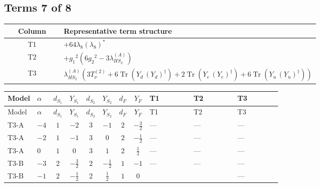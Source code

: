 \documentclass[8pt]{article}
\begin{document}
\begin{landscape}
\subsection*{Terms 7 of 8}
\begin{center}
\begin{tabular}{@{}c >{\raggedright\arraybackslash}p{0.82\linewidth}@{}}
\toprule
Column & Representative term structure \\
\midrule
T1 & \(\displaystyle +64 {\lambda_{8}} \left({\lambda_{8}}\right)^{*}\) \\
\midrule
T2 & \(\displaystyle +{g_1}^2 \left(6 {g_2}^2-3 {\lambda_{HS_2}^{(A)}}\right)\) \\
\midrule
T3 & \(\displaystyle {\lambda_{HS_2}^{(A)}} (3 T_{\nu}^{(2)}+6 \operatorname{Tr}\!\left({Y_d}\,\left({Y_d}\right)^{\dagger}\right)+2 \operatorname{Tr}\!\left({Y_e}\,\left({Y_e}\right)^{\dagger}\right)+6 \operatorname{Tr}\!\left({Y_u}\,\left({Y_u}\right)^{\dagger}\right))\) \\
\midrule
\bottomrule
\end{tabular}
\end{center}
\smallskip
\tiny
\begin{longtable}{@{}llcccccc >{\raggedright\arraybackslash}p{0.21\linewidth} >{\raggedright\arraybackslash}p{0.21\linewidth} >{\raggedright\arraybackslash}p{0.21\linewidth}@{}}
\toprule
Model & $\alpha$ & $d_{S_1}$ & $Y_{S_1}$ & $d_{S_2}$ & $Y_{S_2}$ & $d_F$ & $Y_F$ & T1 & T2 & T3 \\
\midrule
\endfirsthead
\toprule
Model & $\alpha$ & $d_{S_1}$ & $Y_{S_1}$ & $d_{S_2}$ & $Y_{S_2}$ & $d_F$ & $Y_F$ & T1 & T2 & T3 \\
\midrule
\endhead
T3-A & $-4$ & $1$ & $-2$ & $3$ & $-1$ & $2$ & $-\frac{3}{2}$ & --- & --- & --- \\
\midrule
T3-A & $-2$ & $1$ & $-1$ & $3$ & $0$ & $2$ & $-\frac{1}{2}$ & --- & --- & --- \\
\midrule
T3-A & $0$ & $1$ & $0$ & $3$ & $1$ & $2$ & $\frac{1}{2}$ & --- & --- & --- \\
\midrule
T3-B & $-3$ & $2$ & $-\frac{3}{2}$ & $2$ & $-\frac{1}{2}$ & $1$ & $-1$ & --- & --- & --- \\
\midrule
T3-B & $-1$ & $2$ & $-\frac{1}{2}$ & $2$ & $\frac{1}{2}$ & $1$ & $0$ & \scriptsize\adjustbox{max width=\linewidth}{$\begin{gathered} +64 {\lambda_{8}} \left({\lambda_{8}}\right)^{*}\end{gathered}$} & \scriptsize\adjustbox{max width=\linewidth}{$\begin{gathered} +{g_1}^2 \left(6 {g_2}^2-3 {\lambda_{HS_2}^{(A)}}\right)\end{gathered}$} & --- \\

\end{longtable}
\end{landscape}
\end{document}

